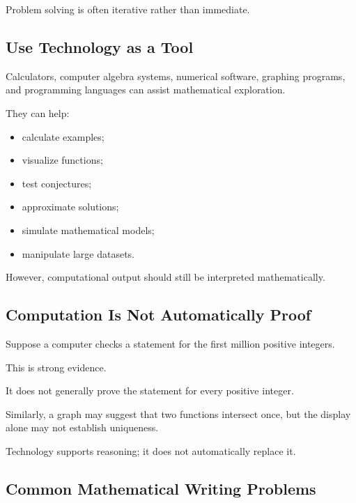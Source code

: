 Problem solving is often iterative rather than immediate.

\subsection{Use Technology as a Tool}
\label{subsec:technology-problem-solving}

Calculators, computer algebra systems, numerical software, graphing programs,
and programming languages can assist mathematical exploration.

They can help:

\begin{itemize}
    \item calculate examples;
    \item visualize functions;
    \item test conjectures;
    \item approximate solutions;
    \item simulate mathematical models;
    \item manipulate large datasets.
\end{itemize}

However, computational output should still be interpreted mathematically.

\subsection{Computation Is Not Automatically Proof}
\label{subsec:computation-not-proof}

Suppose a computer checks a statement for the first million positive integers.

This is strong evidence.

It does not generally prove the statement for every positive integer.

Similarly, a graph may suggest that two functions intersect once, but the
display alone may not establish uniqueness.

Technology supports reasoning; it does not automatically replace it.

\subsection{Common Mathematical Writing Problems}
\label{subsec:common-writing-problems}

